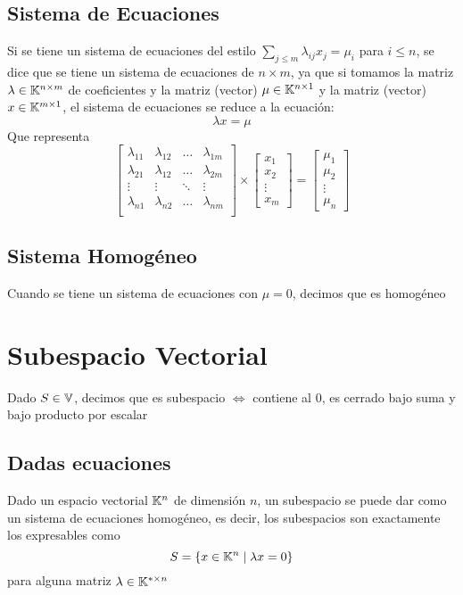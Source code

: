 \documentclass{article}
\begin{document}
\subsection{Sistema de Ecuaciones}
Si se tiene un sistema de ecuaciones del estilo $\sum_{j \leq m}
\lambda_{ij}x_j = \mu_i$ para $i \leq n$, se dice que se tiene un sistema
de ecuaciones de $n \times m$, ya que si tomamos la matriz $\lambda\in
\mathbb{K}^{n \times m}$ de coeficientes
y la matriz (vector) $\mu \in \mathbb{K}^{n \times 1}$ y la matriz (vector) $x \in
\mathbb{K} ^ {m \times 1}$, el sistema de ecuaciones se reduce a la ecuación:
\[\lambda x = \mu\]
Que representa
\[
	\begin{bmatrix}
		\lambda_{11} & \lambda_{12} & \dots & \lambda_{1m} \\
		\lambda_{21} & \lambda_{12} & \dots & \lambda_{2m} \\
		\vdots & \vdots & \ddots & \vdots \\
		\lambda_{n1} & \lambda_{n2} & \dots & \lambda_{nm} \\
	\end{bmatrix} \times
	\begin{bmatrix}
		x_1 \\
		x_2 \\
		\vdots \\
		x_m
	\end{bmatrix} = 
	\begin{bmatrix}
		\mu_1 \\
		\mu_2 \\
		\vdots \\
		\mu_n
	\end{bmatrix}
\]

\subsection{Sistema Homogéneo}
Cuando se tiene un sistema de ecuaciones con $\mu = 0$, decimos que es homogéneo

\section{Subespacio Vectorial}
Dado $S \in \mathbb{V}$, decimos que es subespacio $\iff$ contiene al $0$, es cerrado bajo
suma y bajo producto por escalar

\subsection{Dadas ecuaciones}
Dado un espacio vectorial $\mathbb{K}^n$ de dimensión $n$,
un subespacio se puede dar como un sistema de ecuaciones homogéneo, es decir,
los subespacios son exactamente los expresables como \[S = \{x \in \mathbb{K}^n
\mid \lambda x = 0\}\]
para alguna matriz $\lambda \in \mathbb{K} ^ {* \times n}$
\end{document}
